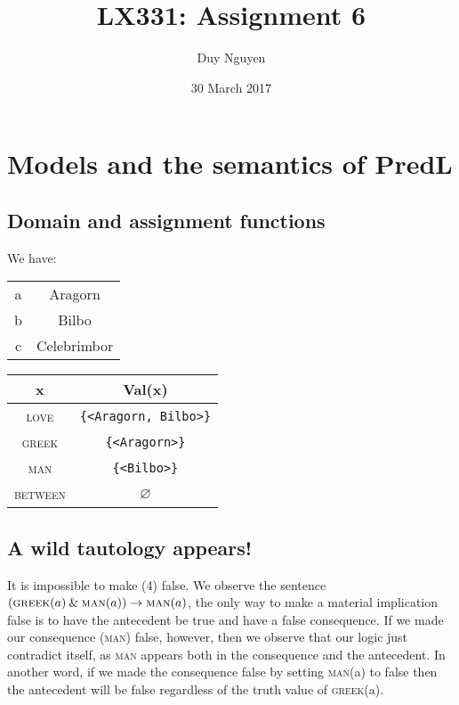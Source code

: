 \documentclass{article}
\title{LX331: Assignment 6}
\author{Duy Nguyen}
\date{30 March 2017}
\begin{document}
\maketitle
\newcommand*{\msim}{\mathord{\sim}}
\newcommand*{\mand}{\mathbin{\&}}

\section{Models and the semantics of PredL}
\subsection{Domain and assignment functions}
We have: 
\begin{center}
    \begin{tabular}{c|c}
        
        a & Aragorn \\
        b & Bilbo   \\
        c & Celebrimbor \\
    \end{tabular}
    \begin{tabular}{c|c}
    \textbf{x} & \textbf{Val(x)} \\ \hline
        \textsc{love} & \verb|{<Aragorn, Bilbo>}| \\
        \textsc{greek} &  \verb|{<Aragorn>}|  \\
        \textsc{man} & \verb|{<Bilbo>}|\\
        \textsc{between} & $\varnothing$ \\
    \end{tabular}
\end{center}

\subsection{A wild tautology appears!}
It is impossible to make (4) false. We observe the sentence $(\textsc{greek}(a) \mand \textsc{man}(a)) \rightarrow \textsc{man}(a)$, the only way to make a material implication false is to have the antecedent be true and have a false consequence. If we made our consequence (\textsc{man}) false, however, then we observe that our logic just contradict itself, as \textsc{man} appears both in the consequence and the antecedent. In another word, if we made the consequence false by setting \textsc{man}(a) to false then the antecedent will be false regardless of the truth value of \textsc{greek}(a). 
\end{document}
